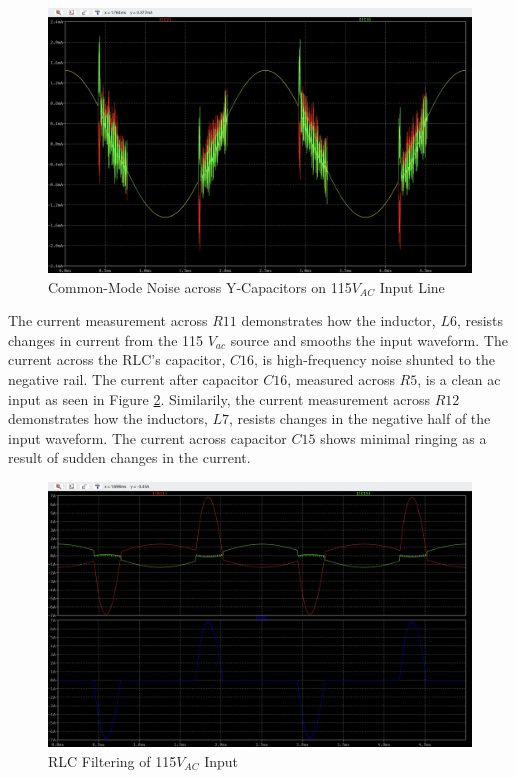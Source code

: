 \documentclass[conference]{IEEEtran}
\begin{document}
\begin{figure}[h]
    \centering
    \includegraphics[width=1.0\linewidth]{ac_input_common_mode_y_cap_noise_waveform.png}
    \caption{Common-Mode Noise across Y-Capacitors on 115$V_{AC}$ Input Line}
    \label{fig:ac_input_common_mode_y_cap_noise_waveform}
\end{figure}

The current measurement across $R11$ demonstrates how the inductor, $L6$, resists changes in current from the 115 $V_{ac}$ source and smooths the input waveform. The current across the RLC's capacitor, $C16$, is high-frequency noise shunted to the negative rail. The current after capacitor $C16$, measured across $R5$, is a clean ac input as seen in Figure \ref{fig:ac_input_rlc_waveforms}. Similarily, the current measurement across $R12$ demonstrates how the inductors, $L7$, resists changes in the negative half of the input waveform. The current across capacitor $C15$ shows minimal ringing as a result of sudden changes in the current. 

\begin{figure}[h]
    \centering
    \includegraphics[width=1.0\linewidth]{ac_input_rlc_waveforms.png}
    \caption{RLC Filtering of 115$V_{AC}$ Input}
    \label{fig:ac_input_rlc_waveforms}
\end{figure}
\end{document}
